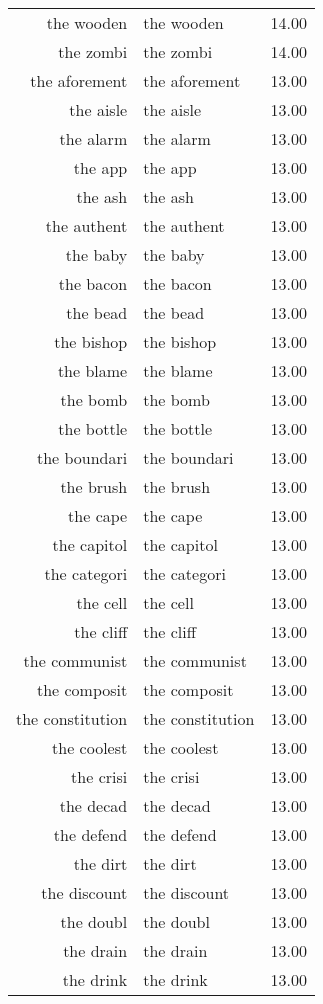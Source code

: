 \begin{table}[ht]
\begin{tabular}{rlr}
  the wooden & the wooden & 14.00 \\ 
  the zombi & the zombi & 14.00 \\ 
  the aforement & the aforement & 13.00 \\ 
  the aisle & the aisle & 13.00 \\ 
  the alarm & the alarm & 13.00 \\ 
  the app & the app & 13.00 \\ 
  the ash & the ash & 13.00 \\ 
  the authent & the authent & 13.00 \\ 
  the baby & the baby & 13.00 \\ 
  the bacon & the bacon & 13.00 \\ 
  the bead & the bead & 13.00 \\ 
  the bishop & the bishop & 13.00 \\ 
  the blame & the blame & 13.00 \\ 
  the bomb & the bomb & 13.00 \\ 
  the bottle & the bottle & 13.00 \\ 
  the boundari & the boundari & 13.00 \\ 
  the brush & the brush & 13.00 \\ 
  the cape & the cape & 13.00 \\ 
  the capitol & the capitol & 13.00 \\ 
  the categori & the categori & 13.00 \\ 
  the cell & the cell & 13.00 \\ 
  the cliff & the cliff & 13.00 \\ 
  the communist & the communist & 13.00 \\ 
  the composit & the composit & 13.00 \\ 
  the constitution & the constitution & 13.00 \\ 
  the coolest & the coolest & 13.00 \\ 
  the crisi & the crisi & 13.00 \\ 
  the decad & the decad & 13.00 \\ 
  the defend & the defend & 13.00 \\ 
  the dirt & the dirt & 13.00 \\ 
  the discount & the discount & 13.00 \\ 
  the doubl & the doubl & 13.00 \\ 
  the drain & the drain & 13.00 \\ 
  the drink & the drink & 13.00 \\ 

\end{tabular}
\end{table}
